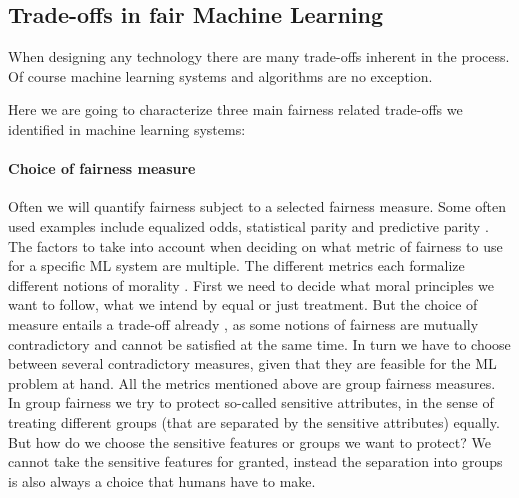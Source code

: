 
	\subsection{Trade-offs in fair Machine Learning}
	When designing any technology \cite{alexander1964notes} there are many trade-offs inherent in the process.
	Of course machine learning systems and algorithms are no exception.


	Here we are going to characterize three main fairness related trade-offs we identified in machine learning systems:
	
	\paragraph{Choice of fairness measure}
	Often we will quantify fairness subject to a selected fairness measure.
	Some often used examples include equalized odds, statistical parity and predictive parity \cite{garg2020fairness}.
    The factors to take into account when deciding on what metric of fairness to use for a specific ML system are multiple.
	The different metrics each formalize different notions of morality \cite{binns2020apparent}.
    First we need to decide what moral principles we want to follow, \ie what we intend by equal or just treatment.
	But the choice of measure entails a trade-off already \cite{chouldechova2017fair} \cite{kleinberg2016inherent} \cite{berk2021fairness}, as some notions of fairness are mutually contradictory and cannot be satisfied at the same time.
	In turn we have to choose between several contradictory measures, given that they are feasible for the ML problem at hand.
	All the metrics mentioned above are group fairness measures.
	In group fairness we try to protect so-called sensitive attributes, in the sense of treating different groups (that are separated by the sensitive attributes) equally.
	But how do we choose the sensitive features or groups we want to protect?
	We cannot take the sensitive features for granted, instead the separation into groups is also always a choice that humans have to make.

